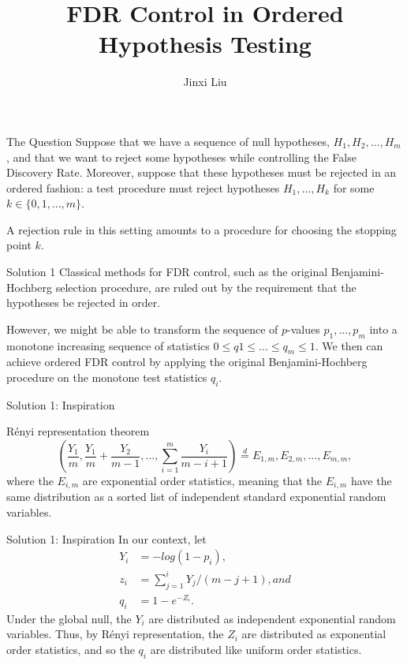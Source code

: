 \documentclass{beamer}
\title{FDR Control in Ordered Hypothesis Testing}
\author{Jinxi Liu}
\begin{document}
	
	\begin{frame}
	
	\titlepage
	
\end{frame}


\begin{frame}[t]{The Question}\vspace{10pt}
Suppose that we have a sequence of null hypotheses, $H_1, H_2,..., H_m$, and that we want to reject some hypotheses while controlling the False Discovery Rate. Moreover, suppose that these hypotheses must be rejected in an ordered fashion: a test procedure must reject hypotheses $H_1,...,H_k$ for some $k \in \{0,1,...,m\}$.

A rejection rule in this setting amounts to a procedure for choosing the stopping point $k$.
\end{frame}


\begin{frame}[t]{Solution 1}\vspace{10pt}
Classical methods for FDR control, such as the original Benjamini-Hochberg selection procedure, are ruled out by the requirement that the hypotheses be rejected in order.

However, we might be able to transform the sequence of $p$-values $p_1,...,p_m$ into a monotone increasing sequence of statistics $0 \leq q1 \leq ... \leq q_m \leq 1$. We then can achieve ordered FDR control by applying the original Benjamini-Hochberg procedure on the monotone test statistics $q_i$.
\end{frame}

\begin{frame}[t]{Solution 1: Inspiration}\vspace{10pt}
\begin{block}{R\'enyi representation theorem }
$$ \left(\frac{Y_1}{m}, \frac{Y_1}{m} + \frac{Y_2}{m-1},...,\sum_{i=1}^{m}\frac{Y_i}{m-i+1} \right)\overset{d}{=} E_{1,m},  E_{2,m},..., E_{m,m} ,$$
where the $E_{i,m}$ are exponential order statistics, meaning that the $E_{i,m}$ have the same distribution as a sorted list of independent standard exponential random variables.
\end{block}
\end{frame}

\begin{frame}[t]{Solution 1: Inspiration}\vspace{10pt}
In our context, let
\begin{align*}
Y_i &= -log(1-p_i), \\
z_i &=\sum_{j=1}^{i}Y_j/(m-j+1), and  \\
q_i &= 1- e^{-Z_i}. 
\end{align*}
Under the global null, the $Y_i$ are distributed as independent exponential random variables. Thus, by  R\'enyi representation, the $Z_i$ are distributed as exponential order statistics, and so the $q_i$ are distributed like uniform order statistics.
\end{frame}
\end{document}
